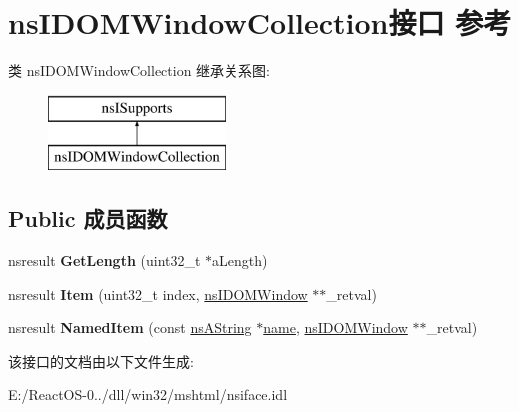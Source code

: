 \hypertarget{interfacens_i_d_o_m_window_collection}{}\section{ns\+I\+D\+O\+M\+Window\+Collection接口 参考}
\label{interfacens_i_d_o_m_window_collection}
类 ns\+I\+D\+O\+M\+Window\+Collection 继承关系图\+:\begin{figure}[H]
\begin{center}
\leavevmode
\includegraphics[height=2.000000cm]{interfacens_i_d_o_m_window_collection}
\end{center}
\end{figure}
\subsection*{Public 成员函数}
\begin{DoxyCompactItemize}
\item 
\mbox{\label{interfacens_i_d_o_m_window_collection_a8afa8f2701e861bd4794e12255b78321}} 
nsresult {\bfseries Get\+Length} (uint32\+\_\+t $\ast$a\+Length)
\item 
\mbox{\label{interfacens_i_d_o_m_window_collection_a58369fb8bf106913281b94e3a7bb6c0e}} 
nsresult {\bfseries Item} (uint32\+\_\+t index, \hyperlink{interfacens_i_d_o_m_window}{ns\+I\+D\+O\+M\+Window} $\ast$$\ast$\+\_\+retval)
\item 
\mbox{\label{interfacens_i_d_o_m_window_collection_ab3318791bf97632d5f01bfb8dc5f1976}} 
nsresult {\bfseries Named\+Item} (const \hyperlink{structns_string_container}{ns\+A\+String} $\ast$\hyperlink{structname}{name}, \hyperlink{interfacens_i_d_o_m_window}{ns\+I\+D\+O\+M\+Window} $\ast$$\ast$\+\_\+retval)
\end{DoxyCompactItemize}


该接口的文档由以下文件生成\+:\begin{DoxyCompactItemize}
\item 
E\+:/\+React\+O\+S-\/0../dll/win32/mshtml/nsiface.\+idl\end{DoxyCompactItemize}
